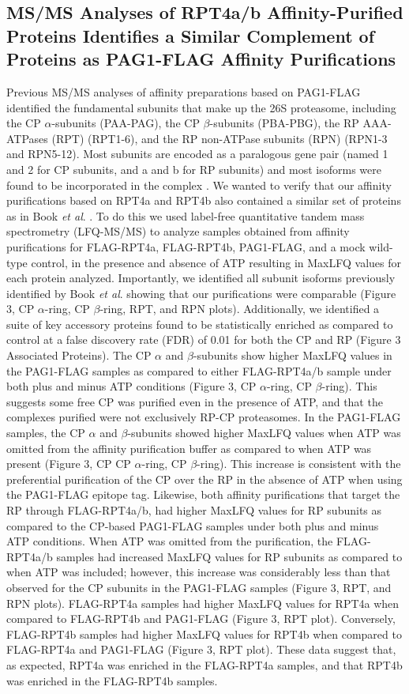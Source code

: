 \subsection{MS/MS Analyses of RPT4a/b Affinity-Purified Proteins Identifies a Similar Complement of Proteins as PAG1-FLAG Affinity Purifications}
	Previous MS/MS analyses of affinity preparations based on PAG1-FLAG identified the fundamental subunits that make up the 26S proteasome, including the CP $\alpha$-subunits (PAA-PAG), the CP $\beta$-subunits (PBA-PBG), the RP AAA-ATPases (RPT) (RPT1-6), and the RP non-ATPase subunits (RPN) (RPN1-3 and RPN5-12). Most subunits are encoded as a paralogous gene pair (named 1 and 2 for CP subunits, and a and b for RP subunits) and most isoforms were found to be incorporated in the complex \citep{book10}. We wanted to verify that our affinity purifications based on RPT4a and RPT4b also contained a similar set of proteins as in Book \textit{et al}. \citep{book10}. To do this we used label-free quantitative tandem mass spectrometry (LFQ-MS/MS) to analyze samples obtained from affinity purifications for FLAG-RPT4a, FLAG-RPT4b, PAG1-FLAG, and a mock wild-type control, in the presence and absence of ATP resulting in MaxLFQ values \citep{cox14} for each protein analyzed. Importantly, we identified all subunit isoforms previously identified by Book \textit{et al}. \citep{book10} showing that our purifications were comparable (Figure 3, CP $\alpha$-ring, CP $\beta$-ring, RPT, and RPN plots).  Additionally, we identified a suite of key accessory proteins found to be statistically enriched as compared to control at a false discovery rate (FDR) of 0.01 for both the CP and RP (Figure 3 Associated Proteins).
The CP $\alpha$ and $\beta$-subunits show higher MaxLFQ values in the PAG1-FLAG samples as compared to either FLAG-RPT4a/b sample under both plus and minus ATP conditions (Figure 3, CP $\alpha$-ring, CP $\beta$-ring). This suggests some free CP was purified even in the presence of ATP, and that the complexes purified were not exclusively RP-CP proteasomes. In the PAG1-FLAG samples, the CP $\alpha$ and $\beta$-subunits showed higher MaxLFQ values when ATP was omitted from the affinity purification buffer as compared to when ATP was present (Figure 3, CP CP $\alpha$-ring, CP $\beta$-ring). This increase is consistent with the preferential purification of the CP over the RP in the absence of ATP when using the PAG1-FLAG epitope tag. 
Likewise, both affinity purifications that target the RP through FLAG-RPT4a/b, had higher MaxLFQ values for RP subunits as compared to the CP-based PAG1-FLAG samples under both plus and minus ATP conditions. When ATP was omitted from the purification, the FLAG-RPT4a/b samples had increased MaxLFQ values for RP subunits as compared to when ATP was included; however, this increase was considerably less than that observed for the CP subunits in the PAG1-FLAG samples (Figure 3, RPT, and RPN plots). FLAG-RPT4a samples had higher MaxLFQ values for RPT4a when compared to FLAG-RPT4b and PAG1-FLAG (Figure 3, RPT plot). Conversely, FLAG-RPT4b samples had higher MaxLFQ values for RPT4b when compared to FLAG-RPT4a and PAG1-FLAG (Figure 3, RPT plot). These data suggest that, as expected, RPT4a was enriched in the FLAG-RPT4a samples, and that RPT4b was enriched in the FLAG-RPT4b samples.


